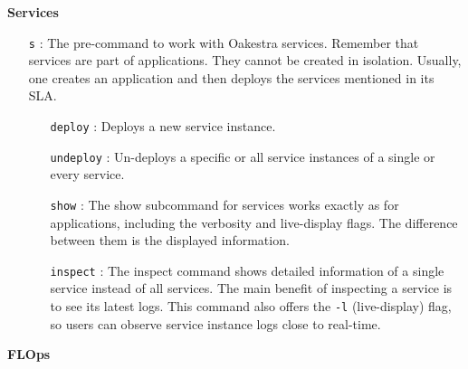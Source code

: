 \vspace{5mm}
\textbf{Services}
\begin{itemize}
    \item [\texttt{s}]:
        The pre-command to work with Oakestra services.
        Remember that services are part of applications.
        They cannot be created in isolation.
        Usually, one creates an application and then deploys the services mentioned in its SLA.
        \begin{itemize}
            \item [\texttt{deploy}]:
                Deploys a new service instance.
            \item [\texttt{undeploy}]:
                Un-deploys a specific or all service instances of a single or every service.
            \item [\texttt{show}]:
                The show subcommand for services works exactly as for applications, including the verbosity and live-display flags.
                The difference between them is the displayed information.
            \item [\texttt{inspect}]:
                The inspect command shows detailed information of a single service instead of all services.
                The main benefit of inspecting a service is to see its latest logs.
                This command also offers the \texttt{-l} (live-display) flag, so users can observe service instance logs close to real-time.
        \end{itemize}
\end{itemize}
\vspace{5mm}
\textbf{FLOps}
